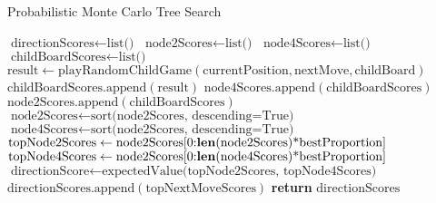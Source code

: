 \documentclass{article}
\DeclareMathOperator*{\argmax}{argmax}
\begin{document}
\begin{algorithm}[H]
    \caption{Probabilistic Monte Carlo Tree Search} 
    \begin{algorithmic}[1]
            \State $\text{directionScores} \gets \text{list()}$
                \State $\text{node2Scores} \gets \text{list()}$
                \State $\text{node4Scores} \gets \text{list()}$
                    \State $\text{childBoardScores} \gets \text{list()}$
                        \State $\text{result} \gets \text{playRandomChildGame}(\text{currentPosition}, \text{nextMove}, \text{childBoard})$
                        \State $\text{childBoardScores}.\text{append}(\text{result})$
                    \EndFor
                        \State $\text{node4Scores}.\text{append}(\text{childBoardScores})$
                    \Else
                        \State $\text{node2Scores}.\text{append}(\text{childBoardScores})$
                    \EndIf
                \EndFor
                \State $\text{node2Scores} \gets \text{sort(node2Scores, descending=True)}$
                \State $\text{node4Scores} \gets \text{sort(node2Scores, descending=True)}$
                \State $\text{topNode2Scores} \gets \text{node2Scores[0:\textbf{len}(node2Scores)*bestProportion]}$
                \State $\text{topNode4Scores} \gets \text{node2Scores[0:\textbf{len}(node4Scores)*bestProportion]}$
                \State $\text{directionScore} \gets \text{expectedValue(topNode2Scores, topNode4Scores)}$
                \State $\text{directionScores}.\text{append}(\text{topNextMoveScores})$
            \EndFor
            \State \textbf{return} $\text{directionScores}$
        \EndFunction
    \end{algorithmic}
\end{algorithm}

\end{document}

